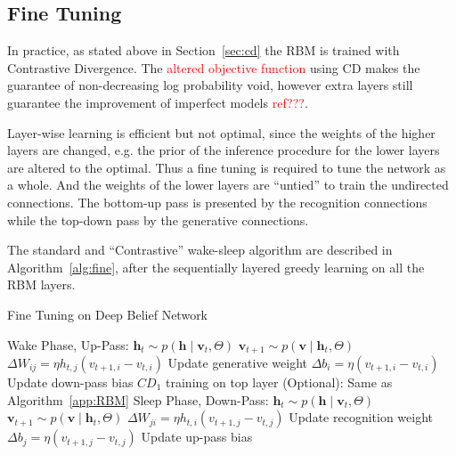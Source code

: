 \documentclass[11pt,twoside,a4paper]{article}
\begin{document}
	\subsection{Fine Tuning}
		In practice, as stated above in Section~\ref{sec:cd} the RBM is trained with Contrastive Divergence.
		The \textcolor{red}{altered objective function} using CD makes the guarantee of non-decreasing log probability void, however extra layers still guarantee the improvement of imperfect models \textcolor{red}{ref???}.
		
		Layer-wise learning is efficient but not optimal, since the weights of the higher layers are changed, e.g. the prior of the inference procedure for the lower layers are altered to the optimal.
		Thus a fine tuning is required to tune the network as a whole.
		And the weights of the lower layers are ``untied'' to train the undirected connections.
		The bottom-up pass is presented by the recognition connections while the top-down pass by the generative connections.
		
		The standard and ``Contrastive'' wake-sleep algorithm are described in Algorithm~\ref{alg:fine}, after the sequentially layered greedy learning on all the RBM layers.
		\begin{algorithm}[tdh!]
		\caption{Fine Tuning on Deep Belief Network}
		\label{alg:fine}
			\begin{algorithmic}
			 
			\State Wake Phase, Up-Pass:
					\State $ \mathbf{h}_t \sim p( \mathbf{h} \mid \mathbf{v}_t, \Theta) $
					\State $ \mathbf{v}_{t+1} \sim p( \mathbf{v} \mid \mathbf{h}_{t}, \Theta) $
					\State $ \Delta W_{ij} = \eta h_{t,j} (v_{t+1,i} - v_{t,i}) $
					\Comment Update generative weight
					\State $ \Delta b_{i} = \eta (v_{t+1,i} - v_{t,i}) $
					\Comment Update down-pass bias
				\EndFor
			\State $CD_1$ training on top layer (Optional):
			\Comment Same as Algorithm~\ref{app:RBM}
			\State Sleep Phase, Down-Pass:
					\State $ \mathbf{h}_t \sim p( \mathbf{h} \mid \mathbf{v}_t, \Theta) $
					\State $ \mathbf{v}_{t+1} \sim p( \mathbf{v} \mid \mathbf{h}_{t}, \Theta) $
					\State $ \Delta W_{ji} = \eta h_{t,i} (v_{t+1,j} - v_{t,j}) $
					\Comment Update recognition weight
					\State $ \Delta b_{j} = \eta (v_{t+1,j} - v_{t,j}) $
					\Comment Update up-pass bias
				\EndFor			
			
			\EndFor
			\end{algorithmic}
		\end{algorithm}				
		
\end{document}

